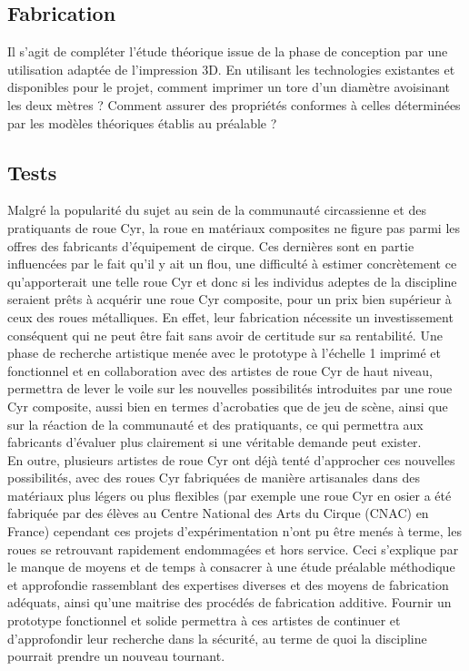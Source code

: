 \subsection{Fabrication}
Il s’agit de compléter l’étude théorique issue de la phase de conception par une utilisation adaptée de l’impression 3D. En utilisant les technologies existantes et disponibles pour le projet, comment imprimer un tore d’un diamètre avoisinant les deux mètres ? Comment assurer des propriétés conformes à celles déterminées par les modèles théoriques établis au préalable ? 

\subsection{Tests}
Malgré la popularité du sujet au sein de la communauté circassienne et des pratiquants de roue Cyr, la roue en matériaux composites ne figure pas parmi les offres des fabricants d’équipement de cirque. Ces dernières sont en partie influencées par le fait qu’il y ait un flou, une difficulté à estimer concrètement ce qu’apporterait une telle roue Cyr et donc si les individus adeptes de la discipline seraient prêts à acquérir une roue Cyr composite, pour un prix bien supérieur à ceux des roues métalliques. En effet, leur fabrication nécessite un investissement conséquent qui ne peut être fait sans avoir de certitude sur sa rentabilité. Une phase de recherche artistique menée avec le prototype à l’échelle 1 imprimé et fonctionnel et en collaboration avec des artistes de roue Cyr de haut niveau, permettra de lever le voile sur les nouvelles possibilités introduites par une roue Cyr composite, aussi bien en termes d'acrobaties que de jeu de scène, ainsi que sur la réaction de la communauté et des pratiquants, ce qui permettra aux fabricants d'évaluer plus clairement si une véritable demande peut exister.\\
En outre, plusieurs artistes de roue Cyr ont déjà tenté d'approcher ces nouvelles possibilités, avec des roues Cyr fabriquées de manière artisanales dans des matériaux plus légers ou plus flexibles (par exemple une roue Cyr en osier a été fabriquée par des élèves au Centre National des Arts du Cirque (CNAC) en France)
cependant ces projets d'expérimentation n'ont pu être menés à terme, les roues se retrouvant rapidement endommagées et hors service. Ceci s'explique par le manque de moyens et de temps à consacrer à une étude préalable méthodique et approfondie rassemblant des expertises diverses et des moyens de fabrication adéquats, ainsi qu'une maitrise des procédés de fabrication additive. Fournir un prototype fonctionnel et solide permettra à ces artistes de continuer et d'approfondir leur recherche dans la sécurité, au terme de quoi la discipline pourrait prendre un nouveau tournant.\\


